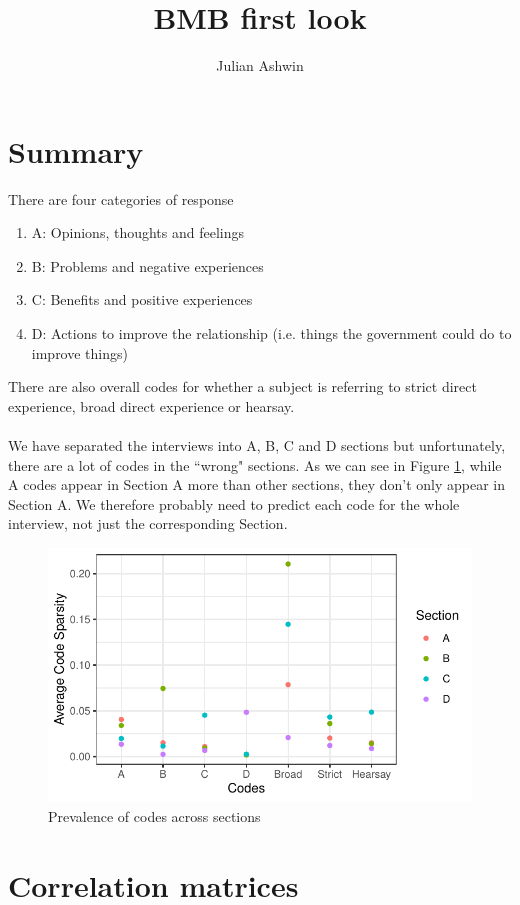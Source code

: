 \documentclass[]{article}
\title{BMB first look }
\author{Julian Ashwin}
\begin{document}
	
	\maketitle
	
	
	\tableofcontents
	
	
	
	\section{Summary}
	
	
	There are four categories of response
	\begin{enumerate}
		\item A: Opinions, thoughts and feelings
		\item B: Problems and negative experiences
		\item C: Benefits and positive experiences
		\item D: Actions to improve the relationship (i.e. things the government could do to improve things) 
	\end{enumerate}
	There are also overall codes for whether a subject is referring to strict direct experience, broad direct experience or hearsay. 
	\\~\\
	We have separated the interviews into A, B, C and D sections but unfortunately, there are a lot of codes in the ``wrong" sections. As we can see in Figure \ref{fig:sparsity_codes}, while A codes appear in Section A more than other sections, they don't only appear in Section A. We therefore probably need to predict each code for the whole interview, not just the corresponding Section. 
	\begin{figure}[H]
		\centering
		\caption{Prevalence of codes across sections} 
		\label{fig:sparsity_codes}
		\includegraphics[width=  0.5 \linewidth]{sparsity_codes_sections}
	\end{figure}

\section{Correlation matrices}
\end{document}
